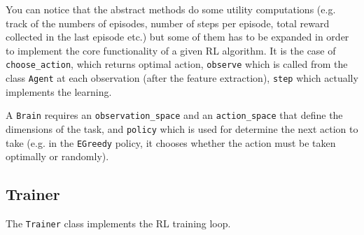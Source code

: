  You can notice that the abstract methods do some utility computations (e.g. track of the numbers of episodes, number of steps per episode, total reward collected in the last episode etc.) but some of them has to be expanded in order to implement the core functionality of a given RL algorithm. It is the case of \texttt{choose\_action}, which returns optimal action, \texttt{observe} which is called from the class \texttt{Agent} at each observation (after the feature extraction), \texttt{step} which actually implements the learning.

 A \texttt{Brain} requires an \texttt{observation\_space} and an \texttt{action\_space} that define the dimensions of the task, and \texttt{policy} which is used for determine the next action to take (e.g. in the \texttt{EGreedy} policy, it chooses whether the action must be taken optimally or randomly).

\subsection{Trainer}
The \texttt{Trainer} class implements the RL training loop.


